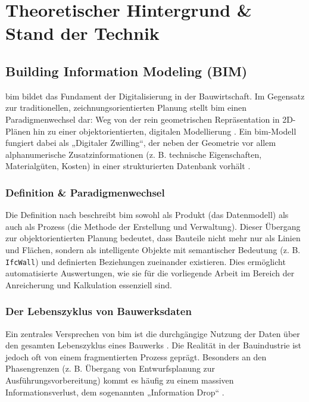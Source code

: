 \section{Theoretischer Hintergrund \& Stand der Technik}
\label{sec:theory}

\subsection{Building Information Modeling (BIM)}
\gls{bim} bildet das Fundament der Digitalisierung in der Bauwirtschaft. Im Gegensatz zur traditionellen, zeichnungsorientierten Planung stellt \gls{bim} einen Paradigmenwechsel dar: Weg von der rein geometrischen Repräsentation in 2D-Plänen hin zu einer objektorientierten, digitalen Modellierung \cite{borrmann2015building}. Ein \gls{bim}-Modell fungiert dabei als „Digitaler Zwilling“, der neben der Geometrie vor allem alphanumerische Zusatzinformationen (z. B. technische Eigenschaften, Materialgüten, Kosten) in einer strukturierten Datenbank vorhält \cite{borrmann2015building}.

\subsubsection{Definition \& Paradigmenwechsel}
Die Definition nach \cite{borrmann2015building} beschreibt \gls{bim} sowohl als Produkt (das Datenmodell) als auch als Prozess (die Methode der Erstellung und Verwaltung). Dieser Übergang zur objektorientierten Planung bedeutet, dass Bauteile nicht mehr nur als Linien und Flächen, sondern als intelligente Objekte mit semantischer Bedeutung (z. B. \texttt{IfcWall}) und definierten Beziehungen zueinander existieren. Dies ermöglicht automatisierte Auswertungen, wie sie für die vorliegende Arbeit im Bereich der Anreicherung und Kalkulation essenziell sind.

\subsubsection{Der Lebenszyklus von Bauwerksdaten}
Ein zentrales Versprechen von \gls{bim} ist die durchgängige Nutzung der Daten über den gesamten Lebenszyklus eines Bauwerks \cite{ISO19650:2018}. Die Realität in der Bauindustrie ist jedoch oft von einem fragmentierten Prozess geprägt. Besonders an den Phasengrenzen (z. B. Übergang von Entwurfsplanung zur Ausführungsvorbereitung) kommt es häufig zu einem massiven Informationsverlust, dem sogenannten „Information Drop“ \cite{sacks2018bim}.

